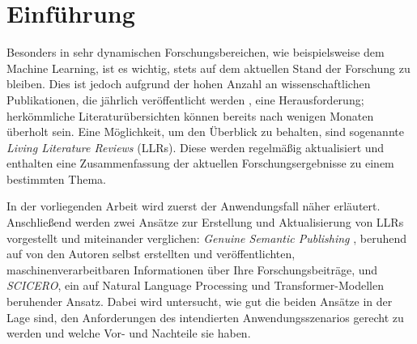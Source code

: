 \section{Einführung}
\label{sec:einfuehrung}

Besonders in sehr dynamischen Forschungsbereichen, wie beispielsweise dem Machine Learning, ist es wichtig, stets auf dem aktuellen Stand der Forschung zu bleiben.
Dies ist jedoch aufgrund der hohen Anzahl an wissenschaftlichen Publikationen, die jährlich veröffentlicht werden \cite{scientific-growth}, eine Herausforderung; herkömmliche Literaturübersichten können bereits nach wenigen Monaten überholt sein.
Eine Möglichkeit, um den Überblick zu behalten, sind sogenannte \textit{Living Literature Reviews} (LLRs).
Diese werden regelmäßig aktualisiert und enthalten eine Zusammenfassung der aktuellen Forschungsergebnisse zu einem bestimmten Thema.

In der vorliegenden Arbeit wird zuerst der Anwendungsfall näher erläutert.
Anschließend werden zwei Ansätze zur Erstellung und Aktualisierung von LLRs vorgestellt und miteinander verglichen:
\textit{Genuine Semantic Publishing} \cite{kuhn2017genuine}, beruhend auf von den Autoren selbst erstellten und veröffentlichten, maschinenverarbeitbaren Informationen über Ihre Forschungsbeiträge, und \textit{SCICERO}, ein auf Natural Language Processing und Transformer-Modellen beruhender Ansatz.
Dabei wird untersucht, wie gut die beiden Ansätze in der Lage sind, den Anforderungen des intendierten Anwendungsszenarios gerecht zu werden und welche Vor- und Nachteile sie haben.
